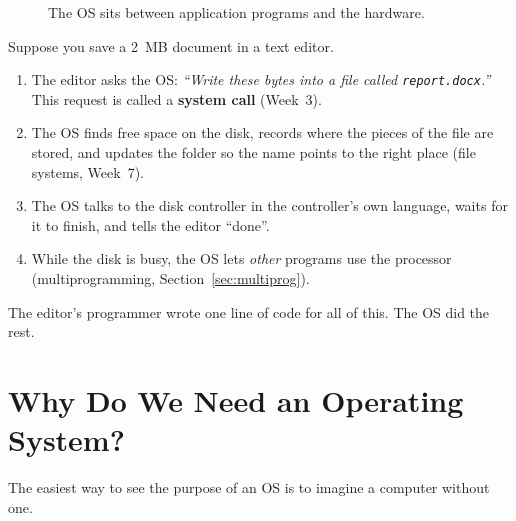 \documentclass[11pt,a4paper]{article}
\newcommand{\term}[1]{\textbf{\color{mintdeep}#1}}
\newcommand{\cmd}[1]{\texttt{#1}}
\begin{document}
\begin{figure}[H]
\centering
{}
\caption{The OS sits between application programs and the hardware.}
\label{fig:layers}
\end{figure}

\begin{example}
Suppose you save a 2~MB document in a text editor.
\begin{enumerate}[leftmargin=1.4em]
  \item The editor asks the OS: \emph{``Write these bytes into a file called \cmd{report.docx}.''} This request is called a \term{system call} (Week~3).
  \item The OS finds free space on the disk, records where the pieces of the file are stored, and updates the folder so the name points to the right place (file systems, Week~7).
  \item The OS talks to the disk controller in the controller's own language, waits for it to finish, and tells the editor ``done''.
  \item While the disk is busy, the OS lets \emph{other} programs use the processor (multiprogramming, Section~\ref{sec:multiprog}).
\end{enumerate}
The editor's programmer wrote one line of code for all of this. The OS did the rest.
\end{example}

\section{Why Do We Need an Operating System?}

The easiest way to see the purpose of an OS is to imagine a computer without one.
\end{document}
